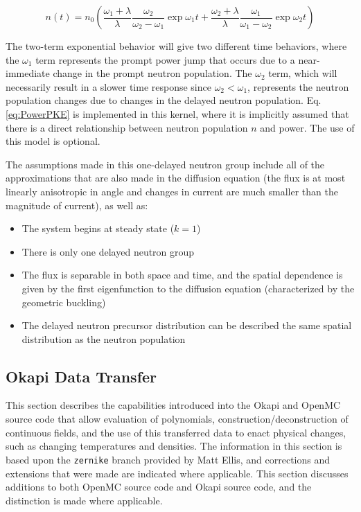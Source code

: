 \documentclass[10pt]{article}
\newcommand{\beq}{\begin{equation}}
\newcommand{\eeq}{\end{equation}}
\numberwithin{equation}{section} %
\begin{document}
\beq
\label{eq:PowerPKE}
n(t)=n_0\left(\frac{\omega_1+\lambda}{\lambda}\frac{\omega_2}{\omega_2-\omega_1}\exp{\omega_1 t} + \frac{\omega_2+\lambda}{\lambda}\frac{\omega_1}{\omega_1-\omega_2}\exp{\omega_2 t}\right)
\eeq

The two-term exponential behavior will give two different time behaviors, where the \(\omega_1\) term represents the prompt power jump that occurs due to a near-immediate change in the prompt neutron population. The \(\omega_2\) term, which will necessarily result in a slower time response since \(\omega_2<\omega_1\), represents the neutron population changes due to changes in the delayed neutron population. Eq. \eqref{eq:PowerPKE} is implemented in this kernel, where it is implicitly assumed that there is a direct relationship between neutron population \(n\) and power. The use of this model is optional.

The assumptions made in this one-delayed neutron group include all of the approximations that are also made in the diffusion equation (the flux is at most linearly anisotropic in angle and changes in current are much smaller than the magnitude of current), as well as:

\begin{itemize}
\item The system begins at steady state (\(k=1\))
\item There is only one delayed neutron group
\item The flux is separable in both space and time, and the spatial dependence is given by the first eigenfunction to the diffusion equation (characterized by the geometric buckling)
\item The delayed neutron precursor distribution can be described the same spatial distribution as the neutron population
\end{itemize}

\subsection{Okapi Data Transfer}
\label{sec:OpenMCTransfer}
This section describes the capabilities introduced into the Okapi and OpenMC source code that allow evaluation of polynomials, construction/deconstruction of continuous fields, and the use of this transferred data to enact physical changes, such as changing temperatures and densities. The information in this section is based upon the {\tt zernike} branch provided by Matt Ellis, and corrections and extensions that were made are indicated where applicable. This section discusses additions to both OpenMC source code and Okapi source code, and the distinction is made where applicable.
\end{document}
